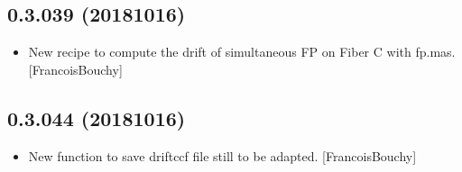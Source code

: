 \documentclass[a4paper,10pt,english]{report}
\begin{document}
\subsection{0.3.039 (2018\sphinxhyphen{}10\sphinxhyphen{}16)}
\label{\detokenize{misc/changelog:id311}}\begin{itemize}
\item {} 
New recipe to compute the drift of simultaneous FP on Fiber C with
fp.mas. {[}FrancoisBouchy{]}

\end{itemize}


\subsection{0.3.044 (2018\sphinxhyphen{}10\sphinxhyphen{}16)}
\label{\detokenize{misc/changelog:id312}}\begin{itemize}
\item {} 
New function  to save driftccf file
 still to be adapted. {[}FrancoisBouchy{]}

\end{itemize}
\end{document}
